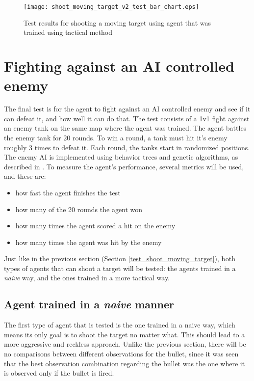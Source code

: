 \begin{figure}
    \begin{center}
        \texttt{[image: shoot\_moving\_target\_v2\_test\_bar\_chart.eps]}
        \caption{Test results for shooting a moving target using agent that was trained using tactical method}
        \label{test_results_shoot_moving_target_v2_bar_chart}
    \end{center}
\end{figure}


\section{Fighting against an AI controlled enemy} \label{test_fight_tank}

The final test is for the agent to fight against an AI controlled enemy and see if it can defeat it, and how well it can do that. The test consists of a 1v1 fight against an enemy tank on the same map where the agent was trained. The agent battles the enemy tank for 20 rounds. To win a round, a tank must hit it's enemy roughly 3 times to defeat it. Each round, the tanks start in randomized positions. The enemy AI is implemented using behavior trees and genetic algorithms, as described in \cite{paduraru2019automatic}. To measure the agent's performance, several metrics will be used, and these are:
\begin{itemize}
    \item how fast the agent finishes the test
    \item how many of the 20 rounds the agent won
    \item how many times the agent scored a hit on the enemy
    \item how many times the agent was hit by the enemy
\end{itemize}

Just like in the previous section (Section \ref{test_shoot_moving_target}), both types of agents that can shoot a target will be tested: the agents trained in a \emph{naive} way, and the ones trained in a more tactical way.

\subsection{Agent trained in a \emph{naive} manner}

The first type of agent that is tested is the one trained in a naive way, which means its only goal is to shoot the target no matter what. This should lead to a more aggressive and reckless approach. Unlike the previous section, there will be no comparisons between different observations for the bullet, since it was seen that the best observation combination regarding the bullet was the one where it is observed only if the bullet is fired.

